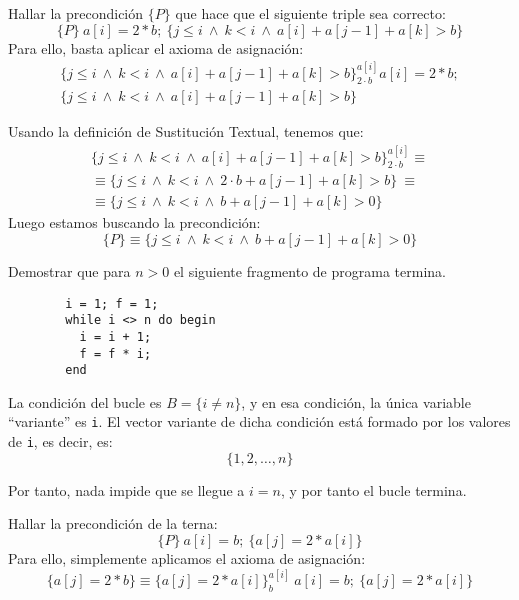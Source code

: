 \begin{ejercicio}
    Hallar la precondición $\{P\}$ que hace que el siguiente triple sea correcto:
    \begin{equation*}
        \{P\}\ a[i]=2\ast b;\ \{j\leq i ~\land~ k < i ~\land~ a[i] + a[j-1]+a[k]>b\}
    \end{equation*}
    Para ello, basta aplicar el axioma de asignación:
    \begin{gather*}
        \{j\leq i~\land~ k < i ~\land~ a[i] + a[j-1]+a[k]>b\}_{2\cdot b}^{a[i]} a[i]=2\ast b;\\ \{j\leq i ~\land~ k < i ~\land~ a[i] + a[j-1]+a[k]>b\}
    \end{gather*}

    Usando la definición de Sustitución Textual, tenemos que:
    \begin{gather*}
        \{j\leq i~\land~ k < i ~\land~ a[i] + a[j-1]+a[k]>b\}_{2\cdot b}^{a[i]} \equiv \\ \equiv \{j\leq i ~\land~ k < i ~\land~ 2\cdot b + a[j-1]+a[k]>b\}
        \ \equiv\\ \equiv \{j\leq i ~\land~ k < i ~\land~ b + a[j-1]+a[k]>0\}
    \end{gather*}
    Luego estamos buscando la precondición:
    \begin{equation*}
        \{P\} \equiv \{j\leq i ~\land~ k < i ~\land ~b + a[j-1]+a[k]>0\}
    \end{equation*}
\end{ejercicio}

\begin{ejercicio}
    Demostrar que para $n>0$ el siguiente fragmento de programa termina.
    \begin{verbatim}
        i = 1; f = 1;
        while i <> n do begin
          i = i + 1;
          f = f * i;
        end
    \end{verbatim}

    La condición del bucle es $B=\{i \neq n\}$, y en esa condición, la única variable ``variante'' es \verb|i|.
    El vector variante de dicha condición está formado por los valores de \verb|i|, es decir, es:
    $$\{1, 2, \ldots, n\}$$

    Por tanto, nada impide que se llegue a $i=n$, y por tanto el bucle termina.
\end{ejercicio}

\begin{ejercicio}
    Hallar la precondición de la terna:
    \begin{equation*}
        \{P\}\ a[i]=b;\ \{a[j] = 2\ast a[i]\}
    \end{equation*}
    Para ello, simplemente aplicamos el axioma de asignación:
    \begin{equation*}
        \{a[j]=2\ast b\} \equiv \{a[j]=2\ast a[i]\}_{b}^{a[i]}\ a[i]=b;\ \{a[j] = 2\ast a[i]\}
    \end{equation*}
\end{ejercicio}

